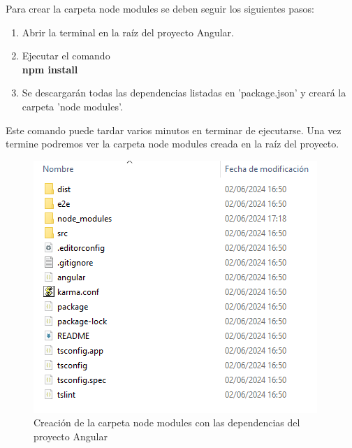 Para crear la carpeta node modules se deben seguir los siguientes pasos:
\begin{enumerate}
    \item Abrir la terminal en la raíz del proyecto Angular.
    \item Ejecutar el comando \\
    \textbf{npm install}
    \item Se descargarán todas las dependencias listadas en 'package.json' y creará la carpeta 'node modules'.
\end{enumerate}

Este comando puede tardar varios minutos en terminar de ejecutarse. Una vez termine podremos ver la carpeta node modules creada en la raíz del proyecto.
\begin{figure}[H]
    \centering
    \includegraphics[width=0.6\linewidth]{img/nodemodules.png}
    \caption{Creación de la carpeta node modules con las dependencias del proyecto Angular}
    \label{fig:enter-label}
\end{figure}

